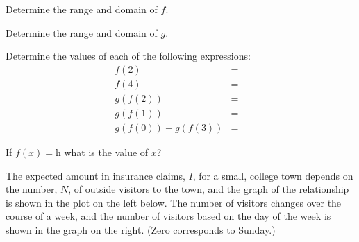 \begin{problem}
  \begin{subproblem}
  \item Determine the range and domain of $f$.
    \vspace{2em}
  \item Determine the range and domain of $g$.
    \vspace{2em}
  \item Determine the values of each of the following expressions:
    \begin{eqnarray*}
      f(2) & = & \\
      f(4) & = & \\
      g(f(2)) & = & \\
      g(f(1)) & = & \\
      g(f(0))+g(f(3)) & = &
    \end{eqnarray*}
  \item If $f(x)=$h what is the value of $x$?
  \end{subproblem}

  \clearpage

\item The expected amount in insurance claims, $I$, for a small,
  college town depends on the number, $N$, of outside visitors to the
  town, and the graph of the relationship is shown in the plot on the
  left below. The number of visitors changes over the course of a
  week, and the number of visitors based on the day of the week is
  shown in the graph on the right. (Zero corresponds to Sunday.)


\end{problem}
